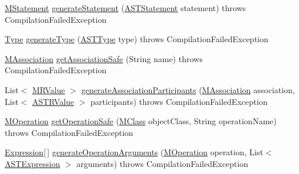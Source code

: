 \begin{DoxyCompactItemize}
\item 
\hyperlink{classorg_1_1tzi_1_1use_1_1uml_1_1sys_1_1soil_1_1_m_statement}{M\-Statement} \hyperlink{classorg_1_1tzi_1_1use_1_1parser_1_1soil_1_1ast_1_1_a_s_t_statement_a6a7d47736cdf75dc29e89893fe78e9db}{generate\-Statement} (\hyperlink{classorg_1_1tzi_1_1use_1_1parser_1_1soil_1_1ast_1_1_a_s_t_statement}{A\-S\-T\-Statement} statement)  throws Compilation\-Failed\-Exception 
\item 
\hyperlink{interfaceorg_1_1tzi_1_1use_1_1uml_1_1ocl_1_1type_1_1_type}{Type} \hyperlink{classorg_1_1tzi_1_1use_1_1parser_1_1soil_1_1ast_1_1_a_s_t_statement_ab8b46620830d26a7f3a5b072ecbf92a3}{generate\-Type} (\hyperlink{classorg_1_1tzi_1_1use_1_1parser_1_1ocl_1_1_a_s_t_type}{A\-S\-T\-Type} type)  throws Compilation\-Failed\-Exception 
\item 
\hyperlink{interfaceorg_1_1tzi_1_1use_1_1uml_1_1mm_1_1_m_association}{M\-Association} \hyperlink{classorg_1_1tzi_1_1use_1_1parser_1_1soil_1_1ast_1_1_a_s_t_statement_a89ea6d9a4899d5a6760519306bd0bc9b}{get\-Association\-Safe} (String name)  throws Compilation\-Failed\-Exception 
\item 
List$<$ \hyperlink{classorg_1_1tzi_1_1use_1_1uml_1_1sys_1_1soil_1_1_m_r_value}{M\-R\-Value} $>$ \hyperlink{classorg_1_1tzi_1_1use_1_1parser_1_1soil_1_1ast_1_1_a_s_t_statement_a2ee8676076f84d541c731ca4ab374e53}{generate\-Association\-Participants} (\hyperlink{interfaceorg_1_1tzi_1_1use_1_1uml_1_1mm_1_1_m_association}{M\-Association} association, List$<$ \hyperlink{classorg_1_1tzi_1_1use_1_1parser_1_1soil_1_1ast_1_1_a_s_t_r_value}{A\-S\-T\-R\-Value} $>$ participants)  throws Compilation\-Failed\-Exception 	
\item 
\hyperlink{classorg_1_1tzi_1_1use_1_1uml_1_1mm_1_1_m_operation}{M\-Operation} \hyperlink{classorg_1_1tzi_1_1use_1_1parser_1_1soil_1_1ast_1_1_a_s_t_statement_a216544dbec9fd86a72f9c65e31987ebc}{get\-Operation\-Safe} (\hyperlink{interfaceorg_1_1tzi_1_1use_1_1uml_1_1mm_1_1_m_class}{M\-Class} object\-Class, String operation\-Name)  throws Compilation\-Failed\-Exception 
\item 
\hyperlink{classorg_1_1tzi_1_1use_1_1uml_1_1ocl_1_1expr_1_1_expression}{Expression}\mbox{[}$\,$\mbox{]} \hyperlink{classorg_1_1tzi_1_1use_1_1parser_1_1soil_1_1ast_1_1_a_s_t_statement_ac07c1d73a6d099ff0809aaf0cc81865e}{generate\-Operation\-Arguments} (\hyperlink{classorg_1_1tzi_1_1use_1_1uml_1_1mm_1_1_m_operation}{M\-Operation} operation, List$<$ \hyperlink{classorg_1_1tzi_1_1use_1_1parser_1_1ocl_1_1_a_s_t_expression}{A\-S\-T\-Expression} $>$ arguments)  throws Compilation\-Failed\-Exception 
\end{DoxyCompactItemize}
